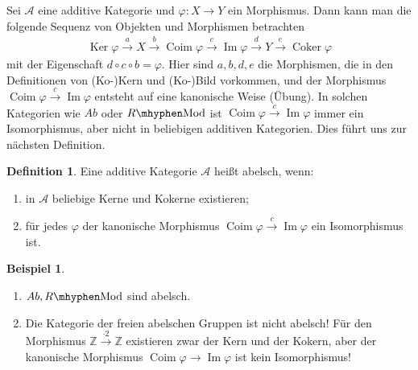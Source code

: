 \documentclass[reqno,12pt]{article}
\numberwithin{equation}{section}
\newcommand{\bZ}{\mathbb{Z}}
\newcommand{\cA}{\mathcal{A}}
\newcommand{\Ker}{\text{Ker }}
\renewcommand{\Im}{\text{Im }}
\theoremstyle{plain}
\theoremstyle{definition}
\newtheorem{definition}[thm]{Definition}
\newtheorem{example}[thm]{Beispiel}
\renewcommand{\Ker}{\operatorname{Ker}}
\renewcommand{\Im}{\operatorname{Im}}
\newcommand{\Coker}{\operatorname{Coker}}
\newcommand{\Coim}{\operatorname{Coim}}
\newcommand{\Mod}{\text{Mod}}
\begin{document}
\bigskip

\noindent Sei $\cA$ eine additive Kategorie und $\varphi \colon X \to Y$ ein Morphismus. Dann kann man die folgende Sequenz von Objekten und Morphismen betrachten
\begin{align*}
\Ker \varphi \overset{a}{\to} X \overset{b}{\to} \Coim \varphi \overset{c}{\to} \Im \varphi \overset{d}{\to} Y \overset{e}{\to} \Coker \varphi
\end{align*}
mit der Eigenschaft $d \circ c \circ b = \varphi$. Hier sind $a,b,d,e$ die Morphismen, die in den Definitionen von (Ko-)Kern und (Ko-)Bild vorkommen, und der Morphismus $\Coim \varphi \overset{c}{\to} \Im \varphi$ entsteht auf eine kanonische Weise (Übung). In solchen Kategorien wie $Ab$ oder $R \mhyphen \Mod$ ist $\Coim \varphi \overset{c}{\to} \Im \varphi$ immer ein Isomorphismus, aber nicht in beliebigen additiven Kategorien. Dies führt uns zur nächsten Definition.



\begin{definition}
Eine additive Kategorie $\cA$ heißt {\sf abelsch}, wenn:
\begin{enumerate}
  \item in $\cA$ beliebige Kerne und Kokerne existieren;
  \item für jedes $\varphi$ der kanonische Morphismus $\Coim \varphi \overset{c}{\to} \Im \varphi$ ein Isomorphismus ist.
\end{enumerate}




\end{definition}

\begin{example}
\
\begin{enumerate}
  \item $Ab, R \mhyphen \Mod$ sind abelsch.
  \item Die Kategorie der freien abelschen Gruppen ist nicht abelsch! Für den Morphismus $\bZ \overset{\cdot 2}{\to} \bZ$ existieren zwar der Kern und der Kokern, aber der kanonische Morphismus $\Coim \varphi \to \Im \varphi$ ist kein Isomorphismus!
\end{enumerate}
\end{example}

\newpage


\end{document}
